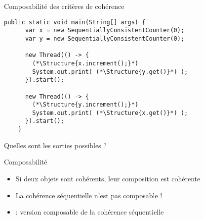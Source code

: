 
\begingroup

\begin{frame}[fragile]{Composabilité des critères de cohérence}
  \begin{lstlisting}[numbers=none]
    public static void main(String[] args) {    
      var x = new SequentiallyConsistentCounter(0);
      var y = new SequentiallyConsistentCounter(0);
      
      new Thread(() -> {
        (*\Structure{x.increment();}*)
        System.out.print( (*\Structure{y.get()}*) );
      }).start();
      
      new Thread(() -> {
        (*\Structure{y.increment();}*)
        System.out.print( (*\Structure{x.get()}*) );
      }).start();
    }
  \end{lstlisting}

  \vspace{-3mm}
  \begin{center}
    \color{exampleColor} Quelles sont les sorties possibles ? 
  \end{center}
  \pause
  \begin{block}{Composabilité}
    \begin{itemize}
    \item Si deux objets sont cohérents, leur composition est cohérente 
    \item \alert{La cohérence séquentielle n'est pas composable !}
    \item {} : version composable de la cohérence séquentielle
    \end{itemize}
  \end{block}
\end{frame}

\endgroup
\endinput
